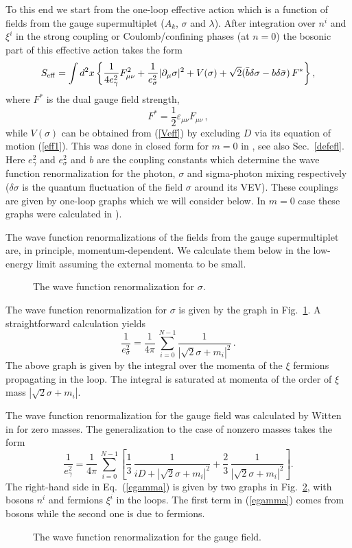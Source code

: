 \documentclass[epsfig,12pt]{article}
\def\beq{\begin{equation}}
\def\eeq{\end{equation}}
\newcommand{\pt}{\partial}
\def\beq{\begin{equation}}
\def\eeq{\end{equation}}
\begin{document}
{To this end we start from the
one-loop effective action which is  a function of fields from the gauge supermultiplet
($A_k$, $\sigma$ and $\lambda$). 
After integration over $n^{i}$ and $\xi^i$ in the strong coupling or Coulomb/confining phases
(at $n=0$)
the bosonic part of this effective action takes the form
\cite{SYhet}
\beq
S_{\rm eff}=
 \int d^2 x \left\{
\frac1{4e_{\gamma}^2}F^2_{\mu\nu} + \frac1{e_{\sigma}^2}
|\pt_{\mu}\sigma|^2
+ V(\sigma)+\sqrt{2}(\bar{b}\delta\sigma- b\delta\bar{\sigma})\,F^{*}
  \right\},
\label{effaction}
\eeq
where 
$F^{*}$ is the  dual gauge field strength,
\beq
F^{*}=\frac12\varepsilon_{\mu\nu}F_{\mu\nu}\,,
\eeq
while $V(\sigma)$ can be obtained from (\ref{Veff}) by excluding $D$ via its equation of motion (\ref{eff1}). This was done in closed form for $m=0$ in \cite{SYhet}, see also Sec.~\ref{defefl}.
Here $e^2_{\gamma}$ and  $e^2_{\sigma}$  and $b$ are the coupling constants which
determine the wave function renormalization for  the photon,  $\sigma$ and sigma-photon mixing
respectively ($\delta \sigma$ is the quantum fluctuation of the field $\sigma$ around its VEV). 
These couplings are given by one-loop graphs which we will consider below. In $m=0$ case
these graphs were calculated in \cite{SYhet}).




The wave function renormalizations of  the fields from the gauge supermultiplet are, 
in principle, momentum-dependent. We calculate them below in the low-energy limit assuming 
the external momenta to be small.

\begin{figure}
\epsfxsize=6cm
\centerline{}
\caption{\small
The wave function renormalization for  $\sigma$. }
\label{fig:esigma}
\end{figure}

The wave function renormalization for $\sigma$ is given by the graph in 
Fig.~\ref{fig:esigma}. A straightforward calculation yields
\beq
\frac1{e^2_{\sigma}}=\frac{1}{4\pi}\,\sum_{i=0}^{N-1}\frac{1}{|\sqrt{2}\sigma+m_i|^2}\,.
\label{esigma}
\eeq
The above graph is given by the integral over
the momenta of the $\xi$ fermions propagating in the loop.
The integral is saturated at momenta of the order of $\xi$
mass $|\sqrt{2}\sigma+m_i|$.

The wave function renormalization for the gauge field was calculated by Witten in 
\cite{W79} for zero masses. The generalization to the case of nonzero masses takes the form
\beq
\frac1{e^2_{\gamma}}=\frac{1}{4\pi}\,\sum_{i=0}^{N-1}\left[\frac13\,\frac{1}{iD+|\sqrt{2}\sigma+m_i|^2}+
\frac23\,\frac{1}{|\sqrt{2}\sigma+m_i|^2}\right].
\label{egamma}
\eeq
The right-hand side in Eq.~(\ref{egamma}) is given by two graphs in 
Fig.~\ref{fig:photon}, with bosons $n^i$ and fermions $\xi^i$
in the loops. The first term in (\ref{egamma}) comes from bosons while the second
one is due to fermions.
\begin{figure}
\epsfxsize=10cm
\centerline{}
\caption{\small
The wave function renormalization for the gauge field.}
\label{fig:photon}
\end{figure}

}
\end{document}
